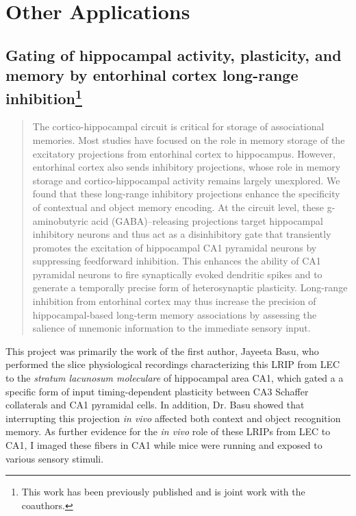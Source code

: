 \acresetall
\chapter{Other Applications}
\label{ch:other}


\section[Gating of hippocampal activity, plasticity, and memory by entorhinal cortex long-range inhibition]{Gating of hippocampal activity, plasticity, and memory by entorhinal cortex long-range inhibition\footnote{This work has been previously published \citep{Basu2016} and is joint work with the coauthors.}}
\label{sec:other:LRIP}

\begin{quote}
The cortico-hippocampal circuit is critical for storage of associational memories. Most studies have focused on the role in memory storage of the excitatory projections from entorhinal cortex to hippocampus. However, entorhinal cortex also sends inhibitory projections, whose role in memory storage and cortico-hippocampal activity remains largely unexplored. We found that these long-range inhibitory projections enhance the specificity of contextual and object memory encoding. At the circuit level, these g-aminobutyric acid (GABA)–releasing projections target hippocampal inhibitory neurons and thus act as a disinhibitory gate that transiently promotes the excitation of hippocampal CA1 pyramidal neurons by suppressing feedforward inhibition. This enhances the ability of CA1 pyramidal neurons to fire synaptically evoked dendritic spikes and to generate a temporally precise form of heterosynaptic plasticity. Long-range inhibition from entorhinal cortex may thus increase the precision of hippocampal-based long-term memory associations by assessing the salience of mnemonic information to the immediate sensory input.
\end{quote}

This project was primarily the work of the first author, Jayeeta Basu, who performed the slice physiological recordings characterizing this \ac{LRIP} from \ac{LEC} to the \emph{stratum lacunosum moleculare} of hippocampal area CA1, which gated a a specific form of input timing-dependent plasticity between CA3 Schaffer collaterals and CA1 pyramidal cells. In addition, Dr. Basu showed that interrupting this projection \emph{in vivo} affected both context and object recognition memory. As further evidence for the \emph{in vivo} role of these LRIPs from LEC to CA1, I imaged these fibers in CA1 while mice were running and exposed to various sensory stimuli.

